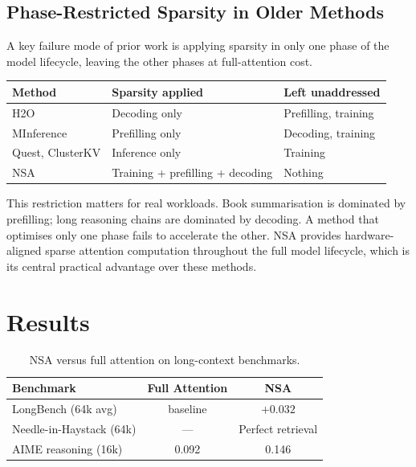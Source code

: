\documentclass[11pt,letterpaper]{article}
\begin{document}
\subsection{Phase-Restricted Sparsity in Older Methods}

A key failure mode of prior work is applying sparsity in only one phase of the model lifecycle,
leaving the other phases at full-attention cost.

\begin{center}\small
\renewcommand{\arraystretch}{1.3}
\begin{tabular}{@{}lll@{}}
\toprule
\textbf{Method} & \textbf{Sparsity applied} & \textbf{Left unaddressed} \\
\midrule
H2O             & Decoding only          & Prefilling, training \\
MInference      & Prefilling only        & Decoding, training \\
Quest, ClusterKV & Inference only        & Training \\
NSA             & Training + prefilling + decoding & Nothing \\
\bottomrule
\end{tabular}
\end{center}

This restriction matters for real workloads. Book summarisation is dominated by prefilling;
long reasoning chains are dominated by decoding. A method that optimises only one phase fails
to accelerate the other. NSA provides hardware-aligned sparse attention computation throughout
the full model lifecycle, which is its central practical advantage over these methods.

\section{Results}
\label{sec:results}

\begin{table}[h]
\centering
\begin{tabular}{lcc}
\toprule
\textbf{Benchmark} & \textbf{Full Attention} & \textbf{NSA} \\
\midrule
LongBench (64k avg)          & baseline & $+0.032$ \\
Needle-in-Haystack (64k)     & ---      & Perfect retrieval \\
AIME reasoning (16k)         & 0.092    & 0.146 \\
\bottomrule
\end{tabular}
\caption{NSA versus full attention on long-context benchmarks.}
\end{table}
\end{document}
